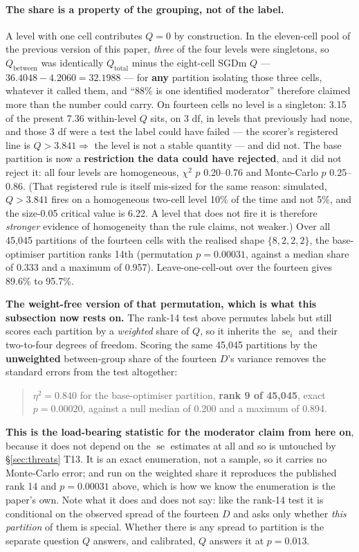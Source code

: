 \documentclass[10pt,letterpaper]{article}
\newcommand{\Dstat}{D}                         %
\DeclareMathOperator{\se}{se}
\begin{document}
\paragraph{The share is a property of the grouping, not of the label.}
A level with one cell contributes $Q = 0$ by construction. In the eleven-cell pool of the
previous version of this paper, \emph{three} of the four levels were singletons, so $Q_{\mathrm{between}}$ was
identically $Q_{\mathrm{total}}$ minus the eight-cell SGDm $Q$ --- $36.4048 - 4.2060 = 32.1988$
--- for \textbf{any} partition isolating those three cells, whatever it called them, and ``88\%
is one identified moderator'' therefore claimed more than the number could carry. On fourteen
cells no level is a singleton: 3.15 of the present 7.36 within-level $Q$ sits, on 3 df, in levels
that previously had none, and those 3 df were a test the label could have failed --- the scorer's
registered line is $Q > 3.841 \Rightarrow$ the level is not a stable quantity --- and did not.
The base partition is now a \textbf{restriction the data could have rejected}, and it did not
reject it: all four levels are homogeneous, $\chi^2$ $p$ 0.20--0.76 and Monte-Carlo $p$
0.25--0.86. (That registered rule is itself mis-sized for the same reason: simulated, $Q > 3.841$
fires on a homogeneous two-cell level 10\% of the time and not 5\%, and the size-0.05 critical
value is 6.22. A level that does not fire it is therefore \emph{stronger} evidence of
homogeneity than the rule claims, not weaker.) Over all 45{,}045 partitions of the fourteen cells
with the realised shape $\{8, 2, 2, 2\}$, the base-optimiser partition ranks 14th
(permutation $p = 0.00031$, against a median share of 0.333 and a maximum of 0.957).
Leave-one-cell-out over the fourteen gives 89.6\% to 95.7\%.

\textbf{The weight-free version of that permutation, which is what this subsection now rests on.}
The rank-14 test above permutes labels but still scores each partition by a \emph{weighted} share
of $Q$, so it inherits the $\se_i$ and their two-to-four degrees of freedom. Scoring the same
45{,}045 partitions by the \textbf{unweighted} between-group share of the fourteen $\Dstat$'s
variance removes the standard errors from the test altogether:
\begin{quote}
$\eta^2 = \mathbf{0.840}$ for the base-optimiser partition, \textbf{rank 9 of 45{,}045}, exact
$p = \mathbf{0.00020}$, against a null median of 0.200 and a maximum of 0.894.
\end{quote}
\textbf{This is the load-bearing statistic for the moderator claim from here on}, because it
does not depend on the $\se$ estimates at all and so is untouched by \S\ref{sec:threats} T13.
It is an exact enumeration, not a sample, so it carries no Monte-Carlo error; and run on the
weighted share it reproduces the published rank 14 and $p = 0.00031$ above, which is how we know
the enumeration is the paper's own. Note what it does and does not say: like the rank-14 test it
is conditional on the observed spread of the fourteen $\Dstat$ and asks only whether \emph{this
partition} of them is special. Whether there is any spread to partition is the separate question
$Q$ answers, and calibrated, $Q$ answers it at $p = 0.013$.
\end{document}
